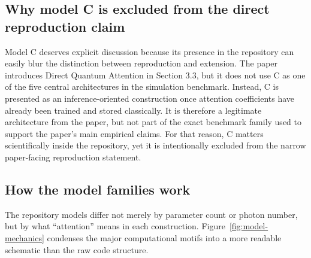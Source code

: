 \documentclass[11pt,a4paper]{article}
\def\texttt#1{#1}%
\begin{document}
\subsection{Why model \texttt{C} is excluded from the direct reproduction claim}

Model \texttt{C} deserves explicit discussion because its presence in the repository can easily blur the distinction between reproduction and extension. The paper introduces Direct Quantum Attention in Section 3.3, but it does not use \texttt{C} as one of the five central architectures in the simulation benchmark. Instead, \texttt{C} is presented as an inference-oriented construction once attention coefficients have already been trained and stored classically. It is therefore a legitimate architecture from the paper, but not part of the exact benchmark family used to support the paper's main empirical claims. For that reason, \texttt{C} matters scientifically inside the repository, yet it is intentionally excluded from the narrow paper-facing reproduction statement.

\subsection{How the model families work}

The repository models differ not merely by parameter count or photon number, but by what ``attention'' means in each construction. Figure~\ref{fig:model-mechanics} condenses the major computational motifs into a more readable schematic than the raw code structure.
\end{document}
